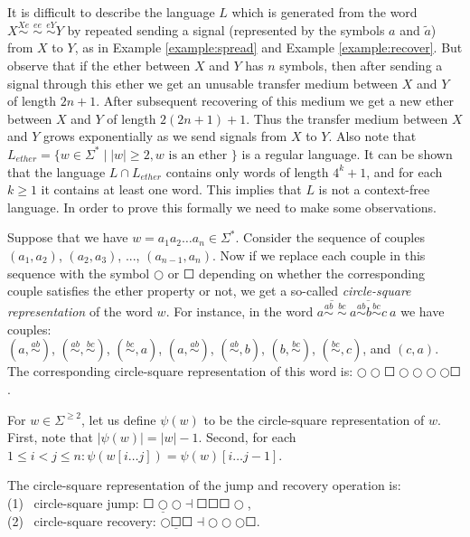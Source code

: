 It is difficult to describe the language $L$ which is generated from the word $X \stackrel{Xe}{\sim} \; \stackrel{ee}{\sim} \; \stackrel{eY}{\sim} Y$ by repeated sending a signal (represented by the symbols $a$ and $\tilde{a}$) from $X$ to $Y$, as in Example \ref{example:spread} and Example \ref{example:recover}. But observe that if the ether between $X$ and $Y$ has $n$ symbols, then after sending a signal through this ether we get an unusable transfer medium between $X$ and $Y$ of length $2n + 1$. After subsequent recovering of this medium we get a new ether between $X$ and $Y$ of length $2(2n+1) + 1$. Thus the transfer medium between $X$ and $Y$ grows exponentially as we send signals from $X$ to $Y$. Also note that $L_{ether} = \{w \in \Sigma^* \mid |w| \ge 2, w \text{ is an ether }\}$ is a regular language. It can be shown that the language $L \cap L_{ether}$ contains only words of length $4^k + 1$, and  for each $k \ge 1$ it contains at least one word. This implies that $L$ is not a context-free language. In order to prove this formally we need to make some observations.

Suppose that we have $w = a_1 a_2 \ldots a_n \in \Sigma^*$. Consider the sequence of couples $(a_1, a_2)$, $(a_2, a_3)$, ..., $(a_{n-1}, a_n)$. Now if we replace each couple in this sequence with the symbol $\Circle$ or $\Square$ depending on whether the
corresponding couple satisfies the ether property or not, we get a so-called \emph{circle-square representation} of the word $w$. For instance, in the word $\overline{a \stackrel{ab}{\sim} \; \stackrel{bc}{\sim}}\ \overline{a \stackrel{ab}{\sim} b \stackrel{bc}{\sim} c}\ a$ we have couples:\\
\indent $(a, \stackrel{ab}{\sim})$,
$(\stackrel{ab}{\sim}, \stackrel{bc}{\sim})$,
$(\stackrel{bc}{\sim}, a)$,
$(a, \stackrel{ab}{\sim})$,
$(\stackrel{ab}{\sim}, b)$,
$(b, \stackrel{bc}{\sim})$,
$(\stackrel{bc}{\sim}, c)$, and
$(c, a)$.\\
The corresponding circle-square representation of this word is: $\Circle \Circle \Square \Circle \Circle \Circle \Circle \Square$.

For $w \in \Sigma^{\ge 2}$, let us define $\psi(w)$ to be the circle-square representation of $w$. First, note that $|\psi(w)| = |w| - 1$. Second, for each $1 \le i < j \le n: \psi(w[i \ldots j]) = \psi(w)[i \ldots j - 1]$.

The circle-square representation of the jump and recovery operation is:\\
\indent \indent (1) \ circle-square jump: $\Square \underline{\Circle} \Circle \dashv \Square \Square \Square \Circle$,\\
\indent \indent (2) \ circle-square recovery: $\Circle \underline{\Square} \Square \dashv \Circle \Circle \Circle \Square$.

